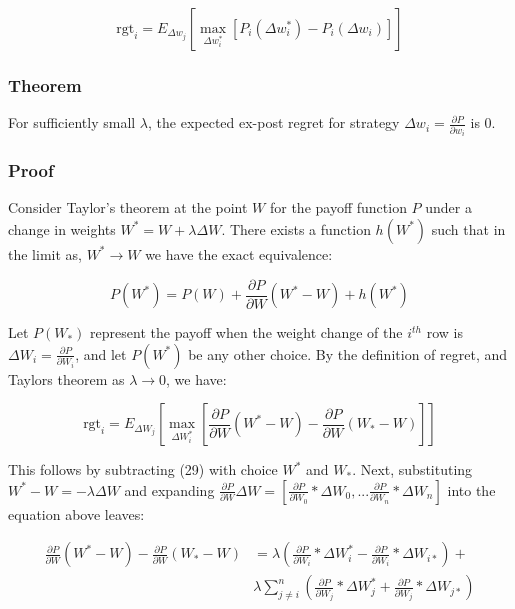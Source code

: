 \documentclass{article}
\begin{document}
\begin{equation}
\textrm{rgt}_i = E_{\Delta w_j} [ \max_{\Delta w_i^*} [P_i(\Delta w_i^*) - P_i(\Delta w_i)] ] 
\end{equation}

\subsubsection{Theorem}

For sufficiently small $\lambda$, the expected ex-post regret for strategy $\Delta w_i = \frac{\partial P}{\partial w_i}$ is 0.
\smallskip

\subsubsection{Proof}

Consider Taylor's theorem at the point $W$ for the payoff function $P$ under a change in weights $W^* = W + \lambda \Delta W$. There exists a function $h(W^*)$ such that in the limit as, $W^* \rightarrow W$ we have the exact equivalence:
\smallskip

\begin{equation}
P(W^*) = P(W) + \frac{\partial P}{\partial W} (W^* - W) + h(W^*) 
\end{equation}

Let $P(W_*)$ represent the payoff when the weight change of the $i^{th}$ row is $\Delta W_i = \frac{\partial P}{\partial W_i}$, and let $P(W^*)$ be any other choice. By the definition of regret, and Taylors theorem as $\lambda \rightarrow 0$, we have:
\smallskip

\begin{equation}
\textrm{rgt}_i = E_{\Delta W_j} [ \max_{\Delta W_i^*} [\frac{\partial P}{\partial W} (W^* - W) - \frac{\partial P}{\partial W} (W_* - W)] ]
\end{equation}

This follows by subtracting (29) with choice $W^*$ and $W_*$. Next, substituting $W^* - W = -\lambda \Delta W$ and expanding  $\frac{\partial P}{\partial W} \Delta W = [\frac{\partial P}{\partial W_0} * \Delta W_0, ... \frac{\partial P}{\partial W_n} * \Delta W_n]$ into the equation above leaves:
\smallskip

\begin{equation}
\begin{split}
\frac{\partial P}{\partial W} (W^* - W) - \frac{\partial P}{\partial W} (W_* - W) &= \lambda (\frac{\partial P}{\partial W_i} * \Delta W_i^* - \frac{\partial P}{\partial W_i} * \Delta W_{i*}) + \\ & \lambda \sum_{j \neq i}^{n} (\frac{\partial P}{\partial W_j} * \Delta W_j^* + \frac{\partial P}{\partial W_j} * \Delta W_{j*})
\end{split}
\end{equation}
\end{document}
